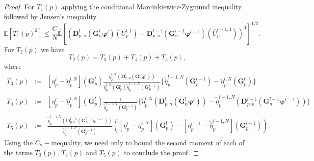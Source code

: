 \documentclass[english]{article}
\begin{document}
\begin{proof}
For $T_1(p)$ applying the conditional Marcinkiewicz-Zygmund inequality followed by Jensen's inequality
\begin{equation}\label{eq:t1p}
\mathbb{E}[T_1(p)^2] \leq \frac{C}{N}\overline{\mathbb{E}}[
(\mathbf{D}_{p,n}^l(\mathbf{G}_n^l\pmb{\varphi}^l)(U_p^{l,1})-\mathbf{D}_{p,n}^{l-1}(\mathbf{G}_n^{l-1}\pmb{\varphi}^{l-1})(\bar{U}_p^{l-1,1}))^4]^{1/2}.
\end{equation}
For $T_2(p)$ we have
$$
T_2(p) = T_3(p) + T_4(p) + T_5(p),
$$
where
\begin{eqnarray}
T_3(p) & := & [\eta_p^l-\check{\eta}_p^{l,N}](\mathbf{G}_p^l)\frac{\check{\eta}_p^{l,N}(\mathbf{D}_{p,n}^l(\mathbf{G}_n^l\pmb{\varphi}^l))}{\check{\eta}_p^{l,N}(\mathbf{G}_p^l)\check{\bar{\eta}}_p^{l-1,N}(\mathbf{G}_p^{l-1})}\Big\{\check{\bar{\eta}}_p^{l-1,N}(\mathbf{G}_p^{l-1})-\check{\eta}_p^{l,N}(\mathbf{G}_p^l)\Big\}\label{eq:t3p}\\
T_4(p) & := & [\eta_p^l-\check{\eta}_p^{l,N}](\mathbf{G}_p^l)\frac{1}{\check{\bar{\eta}}_p^{l-1,N}(\mathbf{G}_p^{l-1})}\Big\{\check{\eta}_p^{l,N}(\mathbf{D}_{p,n}^l(\mathbf{G}_n^l\pmb{\varphi}^l))-\check{\bar{\eta}}_p^{l-1,N}(\mathbf{D}_{p,n}^{l-1}(\mathbf{G}_n^{l-1}\pmb{\varphi}^{l-1}))\Big\}\label{eq:t4p}\\
T_5(p) & := & \frac{\check{\bar{\eta}}_p^{l-1,N}(\mathbf{D}_{p,n}^{l-1}(\mathbf{G}_n^{l-1}\pmb{\varphi}^{l-1}))}{\check{\bar{\eta}}_p^{l-1,N}(\mathbf{G}_p^{l-1})}
\left(
[\eta_p^l-\check{\eta}_p^{l,N}](\mathbf{G}_p^l)
-[\eta_p^{l-1}-\check{\bar{\eta}}_p^{l-1,N}](\mathbf{G}_p^{l-1})
\right).\label{eq:t5p}
\end{eqnarray}
Using the $C_2-$inequality, we need only to bound the second moment of each of the terms $T_3(p)$, $T_4(p)$ and $T_5(p)$ to conclude the proof.


\end{proof}
\end{document}
